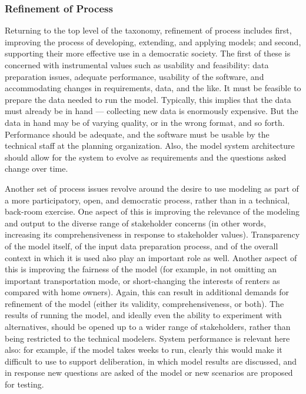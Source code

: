 \subsubsection{Refinement of Process}

Returning to the top level of the taxonomy, refinement of process includes
first, improving the process of developing, extending, and applying models;
and second, supporting their more effective use in a democratic society.
The first of these is concerned with instrumental values such as usability
and feasibility: data preparation issues, adequate performance, usability
of the software, and accommodating changes in requirements, data, and the
like.  It must be feasible to prepare the data needed to run the model.
Typically, this implies that the data must already be in hand ---
collecting new data is enormously expensive.  But the data in hand may be
of varying quality, or in the wrong format, and so forth.  Performance should
be adequate, and the software must be usable by the technical staff at the
planning organization.  Also, the model system architecture should allow
for the system to evolve as requirements and the questions asked change
over time.

Another set of process issues revolve around the desire to use modeling as
part of a more participatory, open, and democratic process, rather than in
a technical, back-room exercise.  One aspect of this is improving the
relevance of the modeling and output to the diverse range of stakeholder
concerns (in other words, increasing its comprehensiveness in response to
stakeholder values).  Transparency of the model itself, of the input data
preparation process, and of the overall context in which it is used also
play an important role as well.  Another aspect of this is improving the
fairness of the model (for example, in not omitting an important
transportation mode, or short-changing the interests of renters as compared
with home owners).  Again, this can result in additional demands for
refinement of the model (either its validity, comprehensiveness, or both).
The results of running the model, and ideally even the ability to
experiment with alternatives, should be opened up to a wider range of
stakeholders, rather than being restricted to the technical modelers.
System performance is relevant here also: for example, if the model takes
weeks to run, clearly this would make it difficult to use to support
deliberation, in which model results are discussed, and in response new
questions are asked of the model or new scenarios are proposed for testing.

